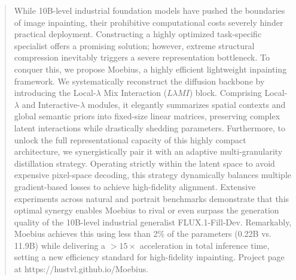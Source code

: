 \documentclass[runningheads]{llncs}
\begin{document}
\begin{abstract}
  While 10B-level industrial foundation models have pushed the boundaries of image inpainting, their prohibitive computational costs severely hinder practical deployment. Constructing a highly optimized task-specific specialist offers a promising solution; however, extreme structural compression inevitably triggers a severe representation bottleneck. To conquer this, we propose Moebius, a highly efficient lightweight inpainting framework. We systematically reconstruct the diffusion backbone by introducing the Local-$\lambda$ Mix Interaction ($L\lambda MI$) block. Comprising Local-$\lambda$ and Interactive-$\lambda$ modules, it elegantly summarizes spatial contexts and global semantic priors into fixed-size linear matrices, preserving complex latent interactions while drastically shedding parameters. Furthermore, to unlock the full representational capacity of this highly compact architecture, we synergistically pair it with an adaptive multi-granularity distillation strategy. Operating strictly within the latent space to avoid expensive pixel-space decoding, this strategy dynamically balances multiple gradient-based losses to achieve high-fidelity alignment. Extensive experiments across natural and portrait benchmarks demonstrate that this optimal synergy enables Moebius to rival or even surpass the generation quality of the 10B-level industrial generalist FLUX.1-Fill-Dev. Remarkably, Moebius achieves this using less than 2\% of the parameters (0.22B vs. 11.9B) while delivering a $>15\times$ acceleration in total inference time, setting a new efficiency standard for high-fidelity inpainting. Project page at https://hustvl.github.io/Moebius.
\end{abstract}
\end{document}

